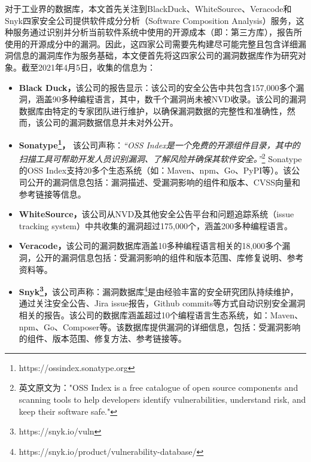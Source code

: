 对于工业界的数据库，本文首先关注到BlackDuck\cite{blackduck}、WhiteSource\cite{whitesource}、Veracode\cite{veracode}和Snyk\cite{snyk}四家安全公司提供软件成分分析（Software Composition Analysis）服务，这种服务通过识别并分析当前软件系统中使用的开源成本（即：第三方库），报告所使用的开源成分中的漏洞。因此，这四家公司需要先构建尽可能完整且包含详细漏洞信息的漏洞库作为服务基础，本文便首先将这四家公司的漏洞数据库作为研究对象。截至2021年4月5日，收集的信息为：

\begin{itemize}[leftmargin=*]
\item\textbf{Black Duck，}该公司的报告显示：该公司的安全公告中共包含157,000多个漏洞，涵盖90多种编程语言，其中，数千个漏洞尚未被NVD收录。该公司的漏洞数据库由特定的专家团队进行维护，以确保漏洞数据的完整性和准确性，然而，该公司的漏洞数据信息并未对外公开。
\item\textbf{Sonatype\footnote{https://ossindex.sonatype.org}，} 该公司声称：\textit{“OSS Index是一个免费的开源组件目录，其中的扫描工具可帮助开发人员识别漏洞、了解风险并确保其软件安全。”}\footnote{英文原文为："OSS Index is a free catalogue of open source components and scanning tools to help developers identify vulnerabilities, understand risk, and keep their software safe."} Sonatype的OSS Index支持20多个生态系统（如：Maven、npm、Go、PyPI等）。该公司公开的漏洞信息包括：漏洞描述、受漏洞影响的组件和版本、CVSS向量和参考链接等信息。
\item\textbf{WhiteSource，}该公司从NVD及其他安全公告平台和问题追踪系统（issue tracking system）中共收集的漏洞超过175,000个，涵盖200多种编程语言。
\item\textbf{Veracode，}该公司的漏洞数据库涵盖10多种编程语言相关的18,000多个漏洞，公开的漏洞信息包括：受漏洞影响的组件和版本范围、库修复说明、参考资料等。
\item\textbf{Snyk\footnote{https://snyk.io/vuln}，}该公司声称：漏洞数据库\footnote{https://snyk.io/product/vulnerability-database/}是由经验丰富的安全研究团队持续维护，通过关注安全公告、Jira issue报告，Github commits等方式自动识别安全漏洞相关的报告。该公司的数据库涵盖超过10个编程语言生态系统，如：Maven、npm、Go、Composer等。该数据库提供漏洞的详细信息，包括：受漏洞影响的组件、版本范围、修复方法、参考链接等。
\end{itemize}

